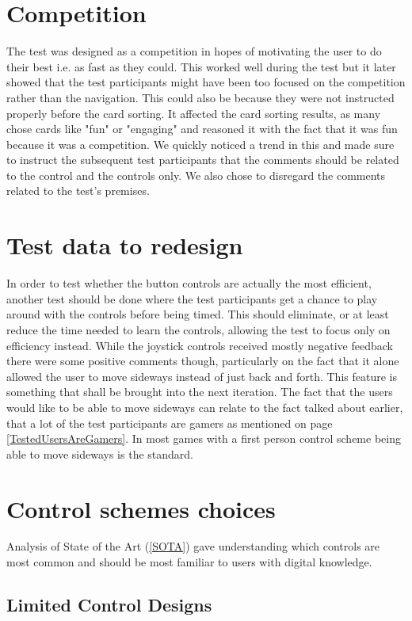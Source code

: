 \section*{Competition}
The test was designed as a competition in hopes of motivating the user to do their best i.e. as fast as they could. This worked well during the test but it later showed that the test participants might have been too focused on the competition rather than the navigation. This could also be because they were not instructed properly before the card sorting. It affected the card sorting results, as many chose cards like "fun" or "engaging" and reasoned it with the fact that it was fun because it was a competition. 
We quickly noticed a trend in this and made sure to instruct the subsequent test participants that the comments should be related to the control and the controls only.
We also chose to disregard the comments related to the test's premises.

\section*{Test data to redesign}
In order to test whether the button controls are actually the most efficient, another test should be done where the test participants get a chance to play around with the controls before being timed. This should eliminate, or at least reduce the time needed to learn the controls, allowing the test to focus only on efficiency instead.
While the joystick controls received mostly negative feedback there were some positive comments though, particularly on the fact that it alone allowed the user to move sideways instead of just back and forth. This feature is something that shall be brought into the next iteration. The fact that the users would like to be able to move sideways can relate to the fact talked about earlier, that a lot of the test participants are gamers as mentioned on page \ref{TestedUsersAreGamers}. In most games with a first person control scheme being able to move sideways is the standard. 

\section*{Control schemes choices}
Analysis of State of the Art (\ref{SOTA}) gave understanding which controls are most common and should be most familiar to users with digital knowledge.

\subsection*{Limited Control Designs} 

